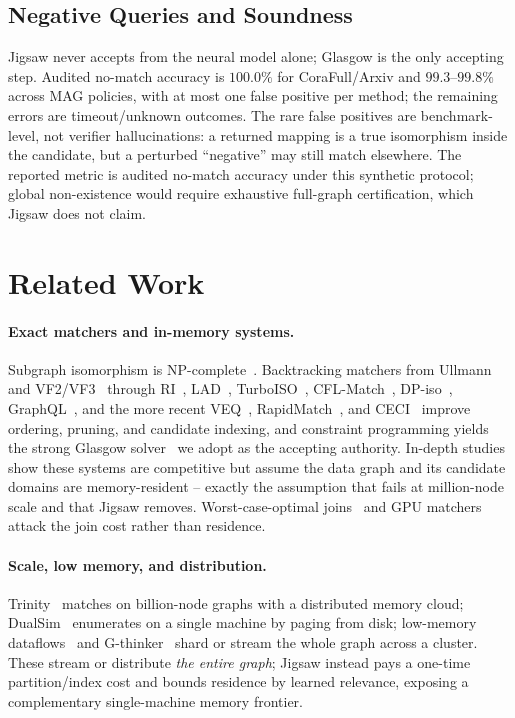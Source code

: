 \documentclass[sigconf, nonacm]{acmart}
\begin{document}
\subsection{Negative Queries and Soundness}
\label{sec:soundness}

Jigsaw never accepts from the neural model alone; Glasgow is the only accepting step. Audited no-match accuracy is $100.0\%$ for CoraFull/Arxiv and $99.3$--$99.8\%$ across MAG policies, with at most one false positive per method; the remaining errors are timeout/unknown outcomes. The rare false positives are benchmark-level, not verifier hallucinations: a returned mapping is a true isomorphism inside the candidate, but a perturbed ``negative'' may still match elsewhere. The reported metric is audited no-match accuracy under this synthetic protocol; global non-existence would require exhaustive full-graph certification, which Jigsaw does not claim.

\section{Related Work}
\label{sec:related}

\paragraph{Exact matchers and in-memory systems.}
Subgraph isomorphism is NP-complete~\cite{ref_garey}. Backtracking matchers from Ullmann~\cite{ref_ullmann} and VF2/VF3~\cite{ref_vf2,ref_vf3} through RI~\cite{ref_ri}, LAD~\cite{ref_lad}, TurboISO~\cite{ref_turboiso}, CFL-Match~\cite{ref_cflmatch}, DP-iso~\cite{ref_daf}, GraphQL~\cite{ref_graphql}, and the more recent VEQ~\cite{ref_veq}, RapidMatch~\cite{ref_rapidmatch}, and CECI~\cite{ref_ceci} improve ordering, pruning, and candidate indexing, and constraint programming yields the strong Glasgow solver~\cite{ref_glasgow} we adopt as the accepting authority. In-depth studies~\cite{ref_survey,ref_survey2024} show these systems are competitive but assume the data graph and its candidate domains are memory-resident -- exactly the assumption that fails at million-node scale and that Jigsaw removes. Worst-case-optimal joins~\cite{ref_wcoj} and GPU matchers~\cite{ref_gsi} attack the join cost rather than residence.

\paragraph{Scale, low memory, and distribution.}
Trinity~\cite{ref_trinity} matches on billion-node graphs with a distributed memory cloud; DualSim~\cite{ref_dualsim} enumerates on a single machine by paging from disk; low-memory dataflows~\cite{ref_lowmem} and G-thinker~\cite{ref_gthinker} shard or stream the whole graph across a cluster. These stream or distribute \emph{the entire graph}; Jigsaw instead pays a one-time partition/index cost and bounds residence by learned relevance, exposing a complementary single-machine memory frontier.
\end{document}

